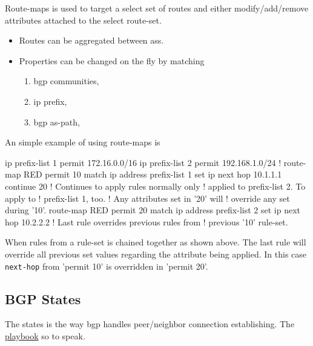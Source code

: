 Route-maps is used to target a select set of routes and either modify/add/remove attributes attached to the select route-set.

\begin{itemize}
    \item Routes can be aggregated between \glspl{as}.
    \item Properties can be changed on the fly by matching
    \begin{enumerate}[label={\alph*)}]
        \item \Gls{bgp} communities,
        \item \Gls{ip} prefix,
        \item \Gls{bgp} as-path, 
    \end{enumerate}
\end{itemize}

An simple example of using route-maps is

\begin{cisco}
ip prefix-list 1 permit 172.16.0.0/16 
ip prefix-list 2 permit 192.168.1.0/24 
!
route-map RED permit 10 
 match ip address prefix-list 1 
 set ip next hop 10.1.1.1
 continue 20              ! Continues to apply rules normally only
                          ! applied to prefix-list 2. To apply to
                          ! prefix-list 1, too.
                          ! Any attributes set in '20' will
                          ! override any set during '10'.
route-map RED permit 20 
 match ip address prefix-list 2 
 set ip next hop 10.2.2.2 ! Last rule overrides previous rules from
                          ! previous '10' rule-set.
\end{cisco}

When rules from a rule-set is chained together as shown above. The last rule will override all previous set values regarding the attribute being applied. In this case \texttt{next-hop} from 'permit 10' is overridden in 'permit 20'.

\subsection[States]{BGP States}

The states is the way \gls{bgp} handles peer/neighbor connection establishing. The \underline{playbook} so to speak.

